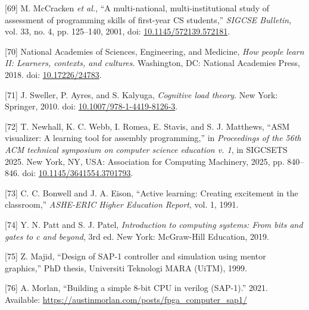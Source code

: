 \documentclass[12pt,oneside]{templates/unerthesis}
\newcommand{\CSLLeftMargin}[1]{#1} %
\newcommand{\CSLRightInline}[1]{#1} %
\newlength{\cslhangindent}
\newenvironment{CSLReferences}[2] %
 {\setlength{\parindent}{0pt}%
  \setlength{\leftskip}{#1 pt\relax}%
  \setlength{\parskip}{#2 pt\relax}%
  \everypar{\setlength{\hangindent}{\cslhangindent}}}
 {\par}
\begin{document}
\begin{CSLReferences}{0}{0}
\leavevmode{}%
\CSLLeftMargin{{[}69{]} }%
\CSLRightInline{M. McCracken \emph{et al.}, {``A multi-national, multi-institutional study of assessment of programming skills of first-year CS students,''} \emph{SIGCSE Bulletin}, vol. 33, no. 4, pp. 125--140, 2001, doi: \href{https://doi.org/10.1145/572139.572181}{10.1145/572139.572181}.}

\leavevmode{}%
\CSLLeftMargin{{[}70{]} }%
\CSLRightInline{National Academies of Sciences, Engineering, and Medicine, \emph{How people learn II: Learners, contexts, and cultures}. Washington, DC: National Academies Press, 2018. doi: \href{https://doi.org/10.17226/24783}{10.17226/24783}.}

\leavevmode{}%
\CSLLeftMargin{{[}71{]} }%
\CSLRightInline{J. Sweller, P. Ayres, and S. Kalyuga, \emph{Cognitive load theory}. New York: Springer, 2010. doi: \href{https://doi.org/10.1007/978-1-4419-8126-3}{10.1007/978-1-4419-8126-3}.}

\leavevmode{}%
\CSLLeftMargin{{[}72{]} }%
\CSLRightInline{T. Newhall, K. C. Webb, I. Romea, E. Stavis, and S. J. Matthews, {``ASM visualizer: A learning tool for assembly programming,''} in \emph{Proceedings of the 56th ACM technical symposium on computer science education v. 1}, in SIGCSETS 2025. New York, NY, USA: Association for Computing Machinery, 2025, pp. 840--846. doi: \href{https://doi.org/10.1145/3641554.3701793}{10.1145/3641554.3701793}.}

\leavevmode{}%
\CSLLeftMargin{{[}73{]} }%
\CSLRightInline{C. C. Bonwell and J. A. Eison, {``Active learning: Creating excitement in the classroom,''} \emph{ASHE-ERIC Higher Education Report}, vol. 1, 1991.}

\leavevmode{}%
\CSLLeftMargin{{[}74{]} }%
\CSLRightInline{Y. N. Patt and S. J. Patel, \emph{Introduction to computing systems: From bits and gates to c and beyond}, 3rd ed. New York: McGraw-Hill Education, 2019.}

\leavevmode{}%
\CSLLeftMargin{{[}75{]} }%
\CSLRightInline{Z. Majid, {``Design of SAP-1 controller and simulation using mentor graphics,''} PhD thesis, Universiti Teknologi MARA (UiTM), 1999.}

\leavevmode{}%
\CSLLeftMargin{{[}76{]} }%
\CSLRightInline{A. Morlan, {``Building a simple 8-bit CPU in verilog (SAP-1).''} 2021. Available: \url{https://austinmorlan.com/posts/fpga_computer_sap1/}}


\end{CSLReferences}
\end{document}
